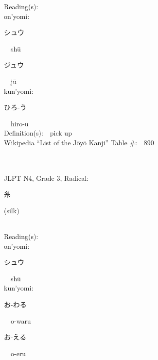 \begin{multicols}{2}
Reading(s):\ \ \\
{\hspace*{1em}}on'yomi:\ \ \\
{\hspace*{2em}}{\begin{CJK}{UTF8}{min} シュウ \end{CJK}}\ \ sh\=u\ \ \\
{\hspace*{2em}}{\begin{CJK}{UTF8}{min} ジュウ \end{CJK}}\ \ j\=u\ \ \\
{\hspace*{1em}}kun'yomi:\ \ \\
{\hspace*{2em}}{\begin{CJK}{UTF8}{min} ひろ-う \end{CJK}}\ \ hiro-u\ \ \\
Definition(s):\ \ pick up \\
Wikipedia ``List of the J\=oy\=o Kanji'' Table \#:\ \ 890 \\
\ \ \\
{\fontsize{34pt}{40pt}  }\ \ \\  %
{JLPT N4, Grade 3, Radical:\ \ {\begin{CJK}{UTF8}{min} 糸 \end{CJK}} (silk) } \\
Reading(s):\ \ \\
{\hspace*{1em}}on'yomi:\ \ \\
{\hspace*{2em}}{\begin{CJK}{UTF8}{min} シュウ \end{CJK}}\ \ sh\=u\ \ \\
{\hspace*{1em}}kun'yomi:\ \ \\
{\hspace*{2em}}{\begin{CJK}{UTF8}{min} お-わる \end{CJK}}\ \ o-waru\ \ \\
{\hspace*{2em}}{\begin{CJK}{UTF8}{min} お-える \end{CJK}}\ \ o-eru\ \ \\

\end{multicols}
